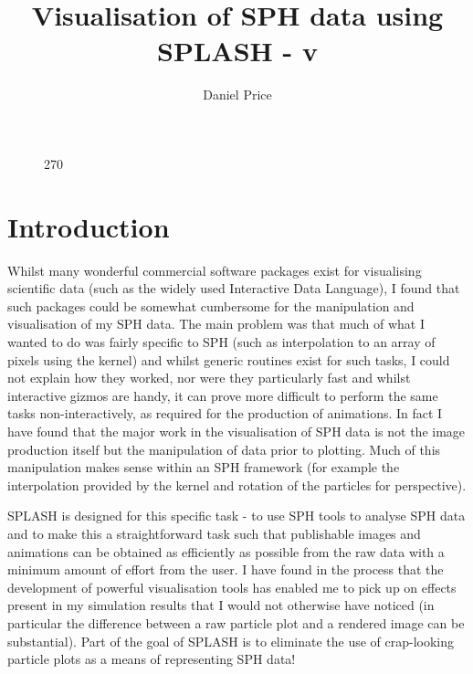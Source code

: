 \documentclass[a4paper,11pt]{article}
\title{Visualisation of SPH data using SPLASH - v}
\author{Daniel Price}
\begin{document}
\begin{figure}
\begin{center}
\begin{turn}{270}\end{turn}
\end{center}
\end{figure}
\maketitle
\tableofcontents
\newpage

\section{Introduction}
 Whilst many wonderful commercial software packages exist for visualising scientific
data (such as the widely used Interactive Data Language), I found that such packages
could be somewhat cumbersome for the manipulation and visualisation of my SPH data. The
main problem was that much of what I wanted to do was fairly specific to SPH (such as
interpolation to an array of pixels using the kernel) and whilst generic routines exist
for such tasks, I could not explain how they worked, nor were they
particularly fast and whilst interactive gizmos are handy, it can prove more difficult to perform the
same tasks non-interactively, as required for the production of animations. 
In fact I have found that the major
work in the visualisation of SPH data is not the image production itself but the
manipulation of data prior to plotting. Much of this manipulation makes sense
within an SPH framework (for example the interpolation provided by the kernel
and rotation of the particles for perspective).

 SPLASH is designed for this specific task - to use SPH tools to analyse SPH data and to make this a
straightforward task such that publishable images and animations can be obtained
as efficiently as possible from the raw data with a minimum amount of effort
from the user. I have found in the process that the development of powerful
visualisation tools has enabled me to pick up on effects present in my
simulation results that I would not otherwise have noticed (in particular the
difference between a raw particle plot and a rendered image can be substantial). Part of the goal of
SPLASH is to eliminate the use of crap-looking particle plots as a means of representing SPH data!
\end{document}
